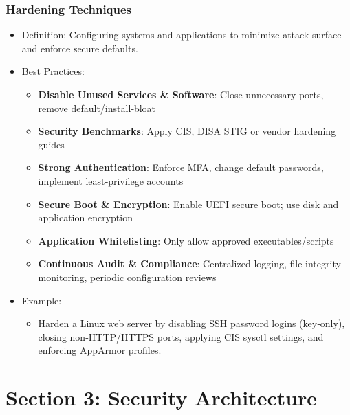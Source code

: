\documentclass[11pt]{article}
\begin{document}
\subsubsection{Hardening Techniques}
\label{sec:orgf2bb95a}
\begin{itemize}
\item Definition: Configuring systems and applications to minimize attack surface and enforce secure defaults.
\item Best Practices:
\begin{itemize}
\item \textbf{\textbf{Disable Unused Services \& Software}}: Close unnecessary ports, remove default/install‑bloat
\item \textbf{\textbf{Security Benchmarks}}: Apply CIS, DISA STIG or vendor hardening guides
\item \textbf{\textbf{Strong Authentication}}: Enforce MFA, change default passwords, implement least‑privilege accounts
\item \textbf{\textbf{Secure Boot \& Encryption}}: Enable UEFI secure boot; use disk and application encryption
\item \textbf{\textbf{Application Whitelisting}}: Only allow approved executables/scripts
\item \textbf{\textbf{Continuous Audit \& Compliance}}: Centralized logging, file integrity monitoring, periodic configuration reviews
\end{itemize}
\item Example:
\begin{itemize}
\item Harden a Linux web server by disabling SSH password logins (key‑only), closing non‑HTTP/HTTPS ports, applying CIS sysctl settings, and enforcing AppArmor profiles.
\end{itemize}
\end{itemize}
\section{Section 3: Security Architecture}
\label{sec:org46df040}
\end{document}

